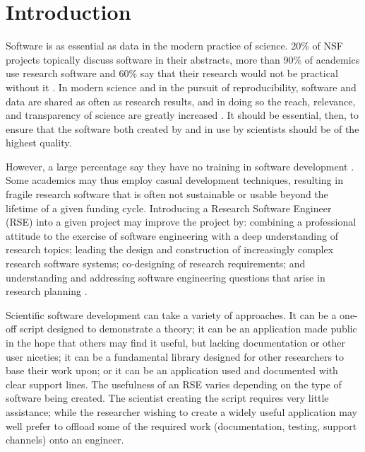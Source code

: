 \documentclass[acmtog, authorversion]{acmart}
\begin{document}


\maketitle

\section{Introduction}

Software is as essential as data in the modern practice of science. 20\% of NSF projects topically discuss software in their abstracts, more than 90\% of academics use research software and 60\% say that their research would not be practical without it \cite{Nangia17}. In modern science and in the pursuit of reproducibility, software and data are shared as often as research results, and in doing so the reach, relevance, and transparency of science are greatly increased \cite{Renci}. It should be essential, then, to ensure that the software both created by and in use by scientists should be of the highest quality.

However, a large percentage say they have no training in software development \cite{Hettrick14}. Some academics may thus employ casual development techniques, resulting in fragile research software that is often not sustainable or usable beyond the lifetime of a given funding cycle. Introducing a Research Software Engineer (RSE) into a given project may improve the project by: combining a professional attitude to the exercise of software engineering with a deep understanding of research topics; leading the design and construction of increasingly complex research software systems; co-designing of research requirements; and understanding and addressing software engineering questions that arise in research planning \cite{Baxter12}.

Scientific software development can take a variety of approaches. It can be a one-off script designed to demonstrate a theory; it can be an application made public in the hope that others may find it useful, but lacking documentation or other user niceties; it can be a fundamental library designed for other researchers to base their work upon; or it can be an application used and documented with clear support lines. The usefulness of an RSE varies depending on the type of software being created. The scientist creating the script requires very little assistance; while the researcher wishing to create a widely useful application may well prefer to offload some of the required work (documentation, testing, support channels) onto an engineer.
\end{document}
